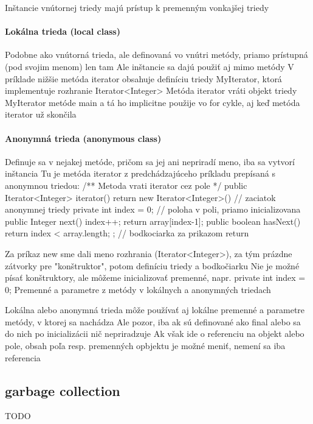 		Inštancie vnútornej triedy majú prístup k premenným vonkajšej triedy
		
		\paragraph{Lokálna trieda (local class)}

		Podobne ako vnútorná trieda, ale definovaná vo vnútri metódy, priamo prístupná (pod svojim menom) len tam
		Ale inštancie sa dajú použiť aj mimo metódy
		V príklade nižšie metóda iterator obsahuje definíciu triedy MyIterator, ktorá implementuje rozhranie Iterator<Integer>
		Metóda iterator vráti objekt triedy MyIterator metóde main a tá ho implicitne použije vo for cykle, aj keď metóda iterator už skončila

		
		\paragraph{Anonymná trieda (anonymous class)}
		Definuje sa v nejakej metóde, pričom sa jej ani nepriradí meno, iba sa vytvorí inštancia
		Tu je metóda iterator z predchádzajúceho príkladu prepísaná s anonymnou triedou:
		    /** Metoda vrati iterator cez pole */
		    public Iterator<Integer> iterator() {
			return new Iterator<Integer>() { // zaciatok anonymnej triedy
			    private int index = 0;  // poloha v poli, priamo inicializovana
			    public Integer next() { 
				index++;
				return array[index-1]; 
			    }
			    public boolean hasNext() {
				return index < array.length;
			    }
			};  // bodkociarka za prikazom return
		    }

		Za príkaz new sme dali meno rozhrania (Iterator<Integer>), za tým prázdne zátvorky pre "konštruktor", potom definíciu triedy a bodkočiarku
		Nie je možné písať konštruktory, ale môžeme inicializovať premenné, napr. private int index = 0;
		Premenné a parametre z metódy v lokálnych a anonymných triedach

		Lokálna alebo anonymná trieda môže používať aj lokálne premenné a parametre metódy, v ktorej sa nachádza
		Ale pozor, iba ak sú definované ako final alebo sa do nich po inicializácii nič nepriradzuje
		Ak však ide o referenciu na objekt alebo pole, obsah poľa resp. premenných opbjektu je možné meniť, nemení sa iba referencia


	\subsection{garbage collection}
		TODO



